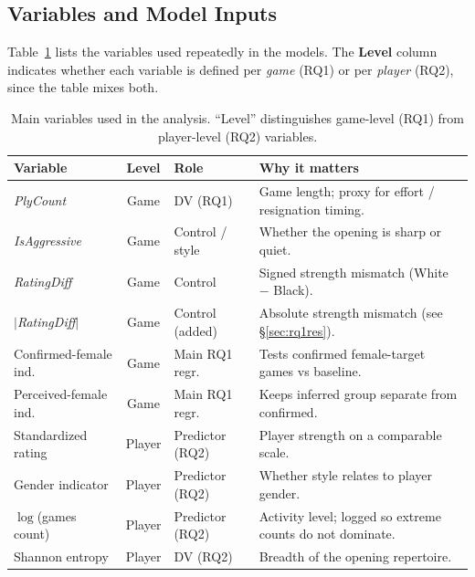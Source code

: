\documentclass[11pt,a4paper]{article}
\begin{document}
\subsection{Variables and Model Inputs}
Table~\ref{tab:variables} lists the variables used repeatedly in the models. The
\textbf{Level} column indicates whether each variable is defined per \emph{game} (RQ1) or per
\emph{player} (RQ2), since the table mixes both.

\begin{table}[H]
\caption{Main variables used in the analysis. ``Level'' distinguishes game-level (RQ1) from
player-level (RQ2) variables.}
\label{tab:variables}
\centering
\renewcommand{\arraystretch}{1.15}
\begin{tabular}{>{\raggedright\arraybackslash}p{3.0cm} c >{\raggedright\arraybackslash}p{2.9cm} >{\raggedright\arraybackslash}p{4.5cm}}
\toprule
Variable & Level & Role & Why it matters \\
\midrule
\textit{PlyCount}              & Game   & DV (RQ1)        & Game length; proxy for effort / resignation timing. \\
\textit{IsAggressive}          & Game   & Control / style & Whether the opening is sharp or quiet. \\
\textit{RatingDiff}            & Game   & Control         & Signed strength mismatch (White $-$ Black). \\
$|$\textit{RatingDiff}$|$      & Game   & Control (added) & Absolute strength mismatch (see \S\ref{sec:rq1res}). \\
Confirmed-female ind.          & Game   & Main RQ1 regr.  & Tests confirmed female-target games vs baseline. \\
Perceived-female ind.          & Game   & Main RQ1 regr.  & Keeps inferred group separate from confirmed. \\
Standardized rating            & Player & Predictor (RQ2) & Player strength on a comparable scale. \\
Gender indicator               & Player & Predictor (RQ2) & Whether style relates to player gender. \\
$\log$(games count)            & Player & Predictor (RQ2) & Activity level; logged so extreme counts do not dominate. \\
Shannon entropy                & Player & DV (RQ2)        & Breadth of the opening repertoire. \\
\bottomrule
\end{tabular}
\end{table}
\end{document}
